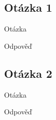 \documentclass[compress]{beamer}
\begin{document}
\subsection{Otázka 1}

\begin{frame}
	\begin{block}{Otázka}
	\end{block}
	\begin{block}{Odpověď}
	\end{block}
\end{frame}

\subsection{Otázka 2}

\begin{frame}
	\begin{block}{Otázka}
	\end{block}
	\begin{block}{Odpověď}
	\end{block}
\end{frame}
\end{document}
